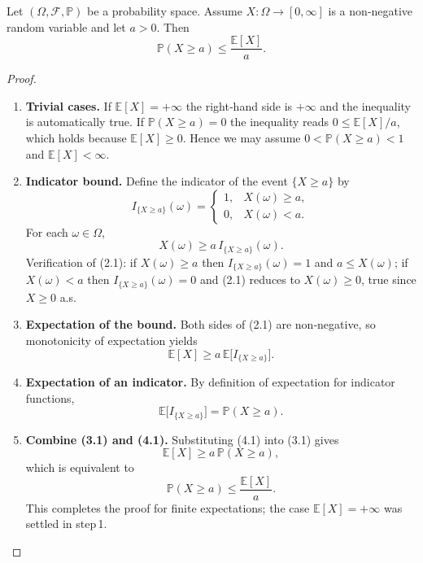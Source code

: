 \begin{theorem}
Let \((\Omega,\mathcal{F},\mathbb{P})\) be a probability space.  
Assume \(X:\Omega\to[0,\infty]\) is a non‑negative random variable and let \(a>0\).  
Then
\[
\mathbb{P}(X\ge a)\le\frac{\mathbb{E}[X]}{a}.
\]
\end{theorem}

\begin{proof}
\begin{enumerate}
\item \textbf{Trivial cases.}  
If \(\mathbb{E}[X]=+\infty\) the right‑hand side is \(+\infty\) and the inequality is automatically true.  
If \(\mathbb{P}(X\ge a)=0\) the inequality reads \(0\le\mathbb{E}[X]/a\), which holds because \(\mathbb{E}[X]\ge0\).  
Hence we may assume \(0<\mathbb{P}(X\ge a)<1\) and \(\mathbb{E}[X]<\infty\).

\item \textbf{Indicator bound.}  
Define the indicator of the event \(\{X\ge a\}\) by
\[
I_{\{X\ge a\}}(\omega)=
\begin{cases}
1, & X(\omega)\ge a,\\[2pt]
0, & X(\omega)< a .
\end{cases}
\]
For each \(\omega\in\Omega\),
\begin{equation}
X(\omega)\ge a\,I_{\{X\ge a\}}(\omega). \tag{2.1}
\end{equation}
Verification of (2.1): if \(X(\omega)\ge a\) then \(I_{\{X\ge a\}}(\omega)=1\) and \(a\le X(\omega)\);  
if \(X(\omega)<a\) then \(I_{\{X\ge a\}}(\omega)=0\) and (2.1) reduces to \(X(\omega)\ge0\), true since \(X\ge0\) a.s.

\item \textbf{Expectation of the bound.}  
Both sides of (2.1) are non‑negative, so monotonicity of expectation yields
\begin{equation}
\mathbb{E}[X]\ge a\,\mathbb{E}\!\big[I_{\{X\ge a\}}\big]. \tag{3.1}
\end{equation}

\item \textbf{Expectation of an indicator.}  
By definition of expectation for indicator functions,
\begin{equation}
\mathbb{E}\!\big[I_{\{X\ge a\}}\big]=\mathbb{P}(X\ge a). \tag{4.1}
\end{equation}

\item \textbf{Combine (3.1) and (4.1).}  
Substituting (4.1) into (3.1) gives
\[
\mathbb{E}[X]\ge a\,\mathbb{P}(X\ge a),
\]
which is equivalent to
\begin{equation}
\mathbb{P}(X\ge a)\le\frac{\mathbb{E}[X]}{a}. \tag{5.1}
\end{equation}
This completes the proof for finite expectations; the case \(\mathbb{E}[X]=+\infty\) was settled in step 1.


\end{enumerate}
\end{proof}
